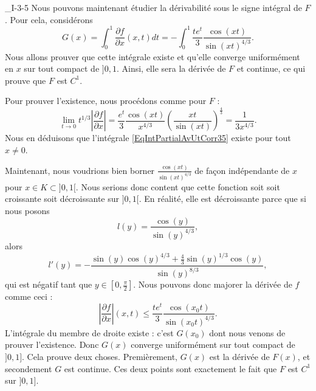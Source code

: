\begin{corrige}{_I-3-5}
Nous pouvons maintenant étudier la dérivabilité sous le signe intégral de $F$. Pour cela, considérons
\begin{equation}		\label{EqIntPartialAvUtCorr35}
	G(x)=\int_0^1\frac{ \partial f }{ \partial x }(x,t)dt=-\int_0^1\frac{ t e^{t} }{ 3 }\frac{ \cos(xt) }{ \sin(xt)^{4/3} }.
\end{equation}
Nous allons prouver que cette intégrale existe et qu'elle converge uniformément en $x$ sur tout compact de $]0,1$. Ainsi, elle sera la dérivée de $F$ et continue, ce qui prouve que $F$ est $C^1$.

Pour prouver l'existence, nous procédons comme pour $F$ :
\begin{equation}
	\lim_{t\to 0}t^{1/3}\left| \frac{ \partial f }{ \partial x } \right| =\frac{ e^t }{ 3 }\frac{ \cos(xt) }{ x^{4/3} }\left( \frac{ xt }{ \sin(xt) } \right)^{\frac{ 4 }{ 3 }}=\frac{ 1 }{ 3x^{4/3} }.
\end{equation}
Nous en déduisons que l'intégrale \eqref{EqIntPartialAvUtCorr35} existe pour tout $x\neq 0$.

Maintenant, nous voudrions bien borner $\frac{ \cos(xt) }{ \sin(xt)^{4/3} }$ de façon indépendante de $x$ pour $x\in K\subset ]0,1[$. Nous serions donc content que cette fonction soit soit croissante soit décroissante sur $]0,1[$. En réalité, elle est décroissante parce que si nous posons
\begin{equation}
		l(y)=\frac{ \cos(y) }{ \sin(y)^{4/3} },
\end{equation}
alors 
\begin{equation}
	l'(y)=-\frac{ \sin(y)\cos(y)^{4/3}+\frac{ 4 }{ 3 }\sin(y)^{1/3}\cos(y) }{ \sin(y)^{8/3} },
\end{equation}
qui est négatif tant que $y\in[0,\frac{ \pi }{ 2 }]$. Nous pouvons donc majorer la dérivée de $f$ comme ceci :
\begin{equation}
	\left| \frac{ \partial f }{ \partial x } \right| (x,t)\leq\frac{ te^t }{ 3 }\frac{ \cos(x_0t) }{ \sin(x_0t)^{4/3} }.
\end{equation}
L'intégrale du membre de droite existe : c'est $G(x_0)$ dont nous venons de prouver l'existence. Donc $G(x)$ converge uniformément sur tout compact de $]0,1]$. Cela prouve deux choses. Premièrement, $G(x)$ est la dérivée de $F(x)$, et secondement $G$ est continue. Ces deux points sont exactement le fait que $F$ est $C^1$ sur $]0,1]$.

\end{corrige}
